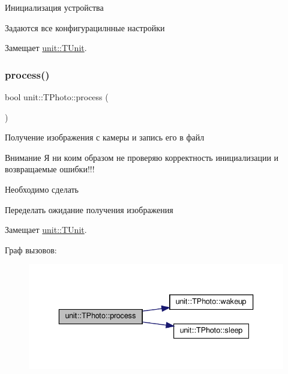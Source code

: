 Инициализация устройства 



 Задаются все конфигурацилнные настройки 

Замещает \hyperlink{classunit_1_1_t_unit_afc001dd57ba88e571e6b650a416b76a5}{unit\+::\+T\+Unit}.

\mbox{\label{classunit_1_1_t_photo_a8323fa27bff29d883e9903b74c341605}} 
\subsubsection{\texorpdfstring{process()}{process()}}
{\footnotesize\ttfamily bool unit\+::\+T\+Photo\+::process (\begin{DoxyParamCaption}{ }\end{DoxyParamCaption})\hspace{0.3cm}{\ttfamily [virtual]}}



Получение изображения с камеры и запись его в файл 



 \begin{DoxyAttention}{Внимание}
Я ни коим образом не проверяю корректность инициализации и возвращаемые ошибки!!! 
\end{DoxyAttention}
\begin{DoxyRefDesc}{Необходимо сделать}
\item[\hyperlink{todo__todo000010}{Необходимо сделать}]Переделать ожидание получения изображения \end{DoxyRefDesc}


Замещает \hyperlink{classunit_1_1_t_unit_a108691c8b988d97c65237c83a31db706}{unit\+::\+T\+Unit}.

Граф вызовов\+:\nopagebreak
\begin{figure}[H]
\begin{center}
\leavevmode
\includegraphics[width=336pt]{classunit_1_1_t_photo_a8323fa27bff29d883e9903b74c341605_cgraph}
\end{center}
\end{figure}
\mbox{\label{classunit_1_1_t_photo_acfdae485260a64864e779cacd15644f7}} 
